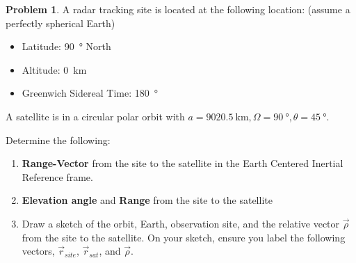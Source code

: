 \documentclass[10pt]{article}
\theoremstyle{definition}
\newtheorem{prob}{Problem}[section]
\newenvironment{subprob}%
{\renewcommand{\theenumi}{\alph{enumi}}\renewcommand{\labelenumi}{(\theenumi)}\begin{enumerate}}%
{\end{enumerate}}%
\newcommand{\extrapage}{\clearpage\newpage\null\newpage}
\begin{document}
\begin{prob}
    A radar tracking site is located at the following location: (assume a perfectly spherical Earth)
    \begin{itemize}
        \item Latitude: \SI{90}{\degree} North
        \item Altitude: \SI{0}{\kilo\meter}
        \item Greenwich Sidereal Time: \SI{180}{\degree}
    \end{itemize}

    A satellite is in a circular polar orbit with \( a = \SI{9020.5}{\kilo\meter}, \Omega = \SI{90}{\degree}, \theta = \SI{45}{\degree}\).

    Determine the following:
    \begin{subprob}
    \item \textbf{Range-Vector} from the site to the satellite in the Earth Centered Inertial Reference frame.
    \item \textbf{Elevation angle} and \textbf{Range} from the site to the satellite
    \item Draw a sketch of the orbit, Earth, observation site, and the relative vector \( \vec \rho \) from the site to the satellite.
        On your sketch, ensure you label the following vectors, \( \vec r_{site} \), \( \vec r_{sat} \), and \( \vec \rho \).
    \end{subprob}
\end{prob}

\extrapage
\extrapage


\end{document}
